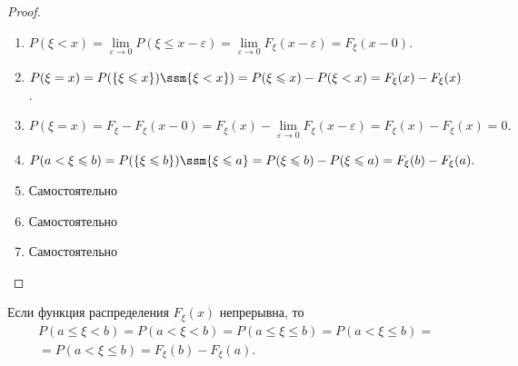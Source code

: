 \begin{proof}
	\begin{enumerate}
		\item $P(\xi<x)=\lim\limits_{\varepsilon\to 0} P(\xi\leqslant x-\varepsilon)=
		\lim\limits_{\varepsilon\to 0} F_{\xi}(x-\varepsilon)=F_{\xi}(x-0)$.

		\item $P(\xi=x)=P(\{\xi\leqslant x\})\ssm\{\xi<x \})=P(\xi\leqslant x)-P(\xi<x)=F_{\xi}(x)-F_{\xi}(x)$.

		\item $P(\xi=x)=F_{\xi}-F_{\xi}(x-0)=F_{\xi}(x)-\lim\limits_{\varepsilon\to 0} F_{\xi}(x-\varepsilon)=F_{\xi}(x)-F_{\xi}(x)=0.$

		\item $P(a<\xi\leqslant b)= P(\{\xi\leqslant b \})\ssm \{\xi\leqslant a \}=
		P(\xi\leqslant b)-P(\xi\leqslant a)= F_{\xi}(b)-F_{\xi}(a).$

		\item Самостоятельно

		\item Самостоятельно

		\item Самостоятельно
	\end{enumerate}
\end{proof}

\begin{consq}
	Если функция распределения $F_{\xi}(x)$ непрерывна, то 
	\begin{gather*}
		P(a\leqslant \xi<b)=P(a<\xi<b)=P(a\leqslant \xi \leqslant b)= P(a< \xi\leqslant b)= \\ 
		=P(a<\xi\leqslant b)=F_{\xi}(b)-F_{\xi}(a).
	\end{gather*}
\end{consq}